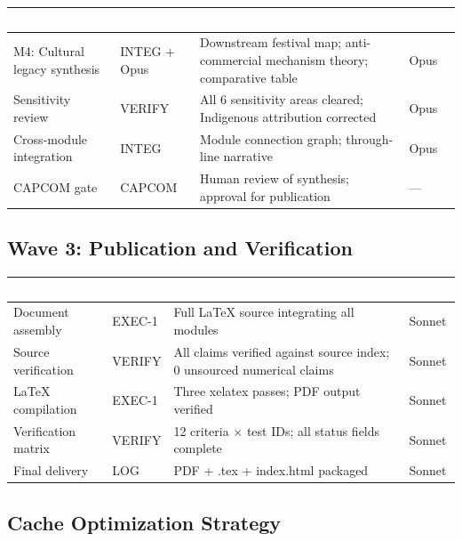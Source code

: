 \documentclass[11pt,letterpaper]{article}
\newcommand{\tableheader}[1]{\textbf{\sffamily\textcolor{white}{#1}}}
\begin{document}
\begin{center}
\begin{tabularx}{\textwidth}{L{2.5cm}L{2cm}XC{2cm}}
\toprule
{}
\tableheader{Task} & \tableheader{Agent} & \tableheader{Output} & \tableheader{Model} \\
\midrule
M4: Cultural legacy synthesis & INTEG + Opus & Downstream festival map; anti-commercial mechanism theory; comparative table & Opus \\
Sensitivity review & VERIFY & All 6 sensitivity areas cleared; Indigenous attribution corrected & Opus \\
Cross-module integration & INTEG & Module connection graph; through-line narrative & Opus \\
CAPCOM gate & CAPCOM & Human review of synthesis; approval for publication & --- \\
\bottomrule
\end{tabularx}
\end{center}

\subsection{Wave 3: Publication and Verification}

\begin{center}
\begin{tabularx}{\textwidth}{L{2.5cm}L{2cm}XC{2cm}}
\toprule
{}
\tableheader{Task} & \tableheader{Agent} & \tableheader{Output} & \tableheader{Model} \\
\midrule
Document assembly & EXEC-1 & Full LaTeX source integrating all modules & Sonnet \\
Source verification & VERIFY & All claims verified against source index; 0 unsourced numerical claims & Sonnet \\
LaTeX compilation & EXEC-1 & Three xelatex passes; PDF output verified & Sonnet \\
Verification matrix & VERIFY & 12 criteria $\times$ test IDs; all status fields complete & Sonnet \\
Final delivery & LOG & PDF + .tex + index.html packaged & Sonnet \\
\bottomrule
\end{tabularx}
\end{center}

\subsection{Cache Optimization Strategy}
\end{document}
